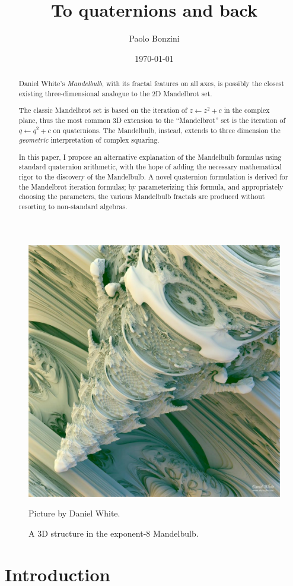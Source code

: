 \documentclass{article}
\title{To quaternions and back}
\date{\today}
\author{Paolo Bonzini}
\begin{document}
\maketitle


\thispagestyle{empty}
\begin{abstract}
  Daniel White's \emph{Mandelbulb}, with its fractal features on all axes,
  is possibly the closest existing three-dimensional analogue to the 2D
  Mandelbrot set.

  The classic Mandelbrot set is based on the iteration of $z\leftarrow
  z^2+c$ in the complex plane, thus the most common 3D extension
  to the ``Mandelbrot'' set is the iteration of $q\leftarrow q^2+c$
  on quaternions.  The Mandelbulb, instead, extends to three dimension
  the \emph{geometric} interpretation of complex squaring.

  In this paper, I propose an alternative explanation of the Mandelbulb
  formulas using standard quaternion arithmetic, with the hope of adding
  the necessary mathematical rigor to the discovery of the Mandelbulb.
  A novel quaternion formulation is derived for the Mandelbrot iteration
  formulas; by parameterizing this formula, and appropriately choosing
  the parameters, the various Mandelbulb fractals are produced without
  resorting to non-standard algebras.
\end{abstract}

\begin{figure}[!b]
\centering
\includegraphics[width=0.45\linewidth]{mbulb.jpg}

\caption{A 3D structure in the exponent-8 Mandelbulb.}
Picture by Daniel White.
\end{figure}

\clearpage

\section{Introduction}
\end{document}
